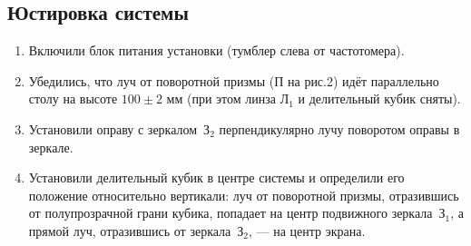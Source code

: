 \documentclass[a4paper,12pt]{article}
\begin{document}
	 	\subsection*{Юстировка системы}
	 	\begin{enumerate}
	 		\item Включили блок питания установки (тумблер слева от частотомера).
	 		\item Убедились, что луч от поворотной призмы (П на рис.2) идёт параллельно столу на высоте $100\pm2$ мм (при этом линза Л$_1$ и делительный кубик сняты).
	 		\item Установили оправу с зеркалом~З$_2$ перпендикулярно лучу поворотом оправы в зеркале.
	 		\item Установили делительный кубик в центре системы и определили его положение относительно вертикали: луч от поворотной призмы, отразившись от полупрозрачной грани кубика, попадает на центр подвижного зеркала~З$_1$, а прямой луч, отразившись от зеркала~З$_2$, --- на центр экрана.
	 	\end{enumerate}
\end{document}
